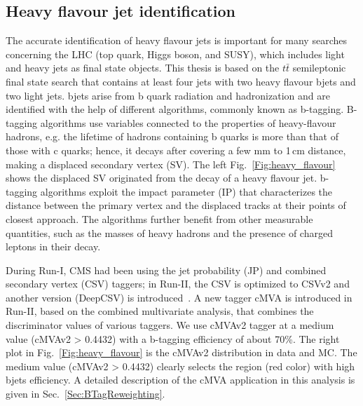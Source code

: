 \subsection{Heavy flavour jet identification}
The accurate identification of heavy flavour jets is important for many searches concerning the LHC (top quark, Higgs boson, and SUSY), which includes light and heavy jets as final state objects. This thesis is based on the $t\bar t$ semileptonic final state search that contains at least four jets with two heavy flavour bjets and two light jets. bjets arise from b quark radiation and hadronization and are identified with the help of different algorithms, commonly known as b-tagging. B-tagging algorithms use variables connected to the properties of heavy-flavour hadrons, e.g. the lifetime of hadrons containing b quarks is more than that of those with c quarks; hence, it decays after covering a few mm to 1\,cm distance, making a displaced secondary vertex (SV). The left Fig.~\ref{Fig:heavy_flavour} shows the displaced SV originated from the decay of a heavy flavour jet. b-tagging algorithms exploit the impact parameter (IP) that characterizes the distance between the primary vertex and the displaced tracks at their points of closest approach. The algorithms further benefit from other measurable quantities, such as the masses of heavy hadrons and the presence of charged leptons in their decay. 

During Run-I, CMS had been using the jet probability (JP) and combined secondary vertex (CSV) taggers; in Run-II, the CSV is optimized to CSVv2 and another version (DeepCSV) is introduced~\cite{Sirunyan:2017ezt}. A new tagger cMVA is introduced in Run-II, based on the combined multivariate analysis, that combines the discriminator values of various taggers. We use cMVAv2 tagger at a medium value (cMVAv2 > 0.4432) with a b-tagging efficiency of about 70\%. The right plot in Fig.~\ref{Fig:heavy_flavour} is the cMVAv2 distribution in data and MC. The medium value (cMVAv2 > 0.4432) clearly selects the region (red color) with high bjets efficiency. A detailed description of the cMVA application in this analysis is given in Sec.~\ref{Sec:BTagReweighting}.    

